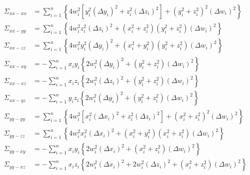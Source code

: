\documentclass[a4paper,11pt]{article}
\begin{document}
\begin{align}
  \Sigma_{xx-xx} &= \sum_{i=1}^n \left\{
  4w_i^2 \left[ y_i^2(\Delta y_i)^2 + z_i^2(\Delta z_i)^2 \right] +
  \left(y_i^2 + z_i^2\right)^2(\Delta w_i)^2
  \right\}\\
  \Sigma_{xx-yy} &= \sum_{i=1}^n \left\{
  4w_i^2z_i^2 (\Delta z_i)^2 + (x_i^2 + z_i^2)(y_i^2 + z_i^2)(\Delta w_i)^2
  \right\}\\
  \Sigma_{xx-zz} &= \sum_{i=1}^n \left\{
  4w_i^2y_i^2 (\Delta y_i)^2 + (x_i^2 + y_i^2)(y_i^2 + z_i^2)(\Delta w_i)^2
  \right\}\\
  \Sigma_{xx-xy} &= -\sum_{i=1}^n x_iy_i  \left\{
  2w_i^2 (\Delta y_i)^2 + (y_i^2 + z_i^2)(\Delta w_i)^2
  \right\}\\
  \Sigma_{xx-xz} &= -\sum_{i=1}^n x_iz_i \left\{
  2w_i^2 (\Delta z_i)^2 + (y_i^2 + z_i^2)(\Delta w_i)^2
  \right\}\\
  \Sigma_{xx-yz} &= -\sum_{i=1}^n y_iz_i \left\{
  2w_i^2 (\Delta y_i)^2 + (y_i^2 + z_i^2)(\Delta w_i)^2
  \right\}\\
  \Sigma_{yy-yy} &= \sum_{i=1}^n \left\{
  4w_i^2 \left[ x_i^2(\Delta x_i)^2 + z_i^2(\Delta z_i)^2 \right] +
  \left(x_i^2 + z_i^2\right)^2(\Delta w_i)^2
  \right\}\\
  \Sigma_{yy-zz} &= \sum_{i=1}^n \left\{
  4w_i^2x_i^2 (\Delta x_i)^2 + (x_i^2 + y_i^2)(x_i^2 + z_i^2)(\Delta w_i)^2
  \right\}\\
  \Sigma_{yy-xy} &= -\sum_{i=1}^n x_iy_i \left\{
  2w_i^2 (\Delta x_i)^2 + (x_i^2 + z_i^2)(\Delta w_i)^2
  \right\}\\
  \Sigma_{yy-xz} &= -\sum_{i=1}^n x_iz_i \left\{
  2w_i^2 (\Delta x_i)^2 + 2w_i^2 (\Delta z_i)^2 +
  (x_i^2 + z_i^2)(\Delta w_i)^2
  \right\}
\end{align}
\end{document}
